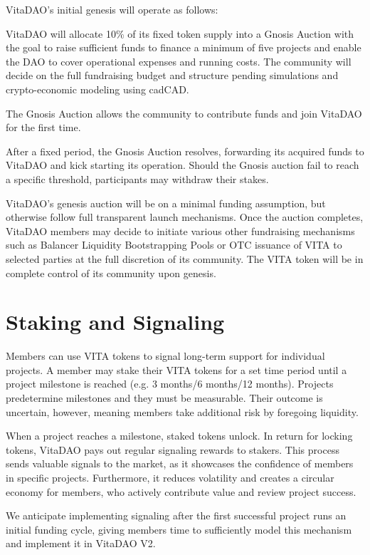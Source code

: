 \documentclass[10pt,letterpaper]{article}
\newenvironment{tight_enumerate}{
\begin{enumerate}
  \setlength{\itemsep}{0pt}
  \setlength{\parskip}{0pt}
}{\end{enumerate}}
\begin{document}
VitaDAO’s initial genesis will operate as follows:
 
\begin{tight_enumerate}
\item VitaDAO will allocate 10\% of its fixed token supply into a Gnosis Auction with the goal to raise sufficient funds to finance a minimum of five projects and enable the DAO to cover operational expenses and running costs. The community will decide on the full fundraising budget and structure pending simulations and crypto-economic modeling using cadCAD. 
\item The Gnosis Auction allows the community to contribute funds and join VitaDAO for the first time. 
\item After a fixed period, the Gnosis Auction resolves, forwarding its acquired funds to VitaDAO and kick starting its operation. Should the Gnosis auction fail to reach a specific threshold, participants may withdraw their stakes.
\end{tight_enumerate}

VitaDAO’s genesis auction will be  on a minimal funding assumption, but otherwise follow full transparent launch mechanisms. Once the auction completes, VitaDAO members may decide to initiate various other fundraising mechanisms such as Balancer Liquidity Bootstrapping Pools or OTC issuance of VITA to selected parties at the full discretion of its community. The VITA token will be in complete control of its community upon genesis.

\section{Staking and Signaling}
Members can use VITA tokens to signal long-term support for individual projects. A member may stake their VITA tokens for a set time period until a project milestone is reached (e.g. 3 months/6 months/12 months). Projects predetermine milestones and they must be measurable. Their outcome is uncertain, however, meaning members take additional risk by foregoing liquidity. 

When a project reaches a milestone, staked tokens unlock. In return for locking tokens, VitaDAO pays out regular signaling rewards to stakers. This process sends valuable signals to the market, as it showcases the confidence of members in specific projects. Furthermore, it reduces volatility and creates a circular economy for members, who actively contribute value and review project success. 

We anticipate implementing signaling after the first successful project runs an initial funding cycle, giving members time to sufficiently model this mechanism and implement it in VitaDAO V2.
\end{document}
